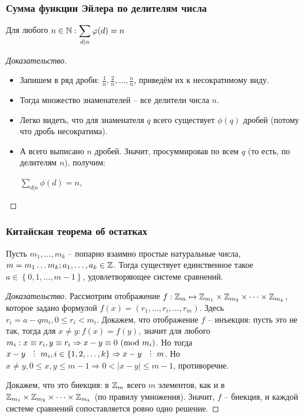 \begin{frame}[t]
    \frametitle{\bf \normalsize Сумма функции Эйлера по делителям числа}
    
    \setcounter{theorem}{16}
    \begin{theorem}[]
        Для любого $n \in \mathbb{N}: \displaystyle \sum_{d \mid n} \varphi(d) = n$
    \end{theorem}

    \begin{proof}[Доказательство]
        \begin{itemize}
            \item Запишем в ряд дроби: $\frac{1}{n}, \frac{2}{n}, \dots, \frac{n}{n}$, приведём их к несократимому виду.
            \item Тогда множество знаменателей -- все делители числа $n$.
            \item Легко видеть, что для знаменателя $q$ всего существует $\phi(q)$ дробей (потому что дробь несократима).
            \item А всего выписано $n$ дробей. Значит, просуммировав по всем $q$ (то есть, по делителям $n$), получим:
                \begin{center}
                    $\displaystyle\sum_{d | n} \phi(d) = n$, \qedsymbol
                \end{center}
        \end{itemize}
    \end{proof}
\end{frame}



\begin{frame}[t]
    \frametitle{\bf \normalsize Китайская теорема об остатках}
    \small
    \setcounter{theorem}{18}
    \begin{theorem}
        Пусть $m_1, \dots, m_k$ -- попарно взаимно простые натуральные числа, $m = m_1 \dots m_k; a_1, \dots, a_k \in \mathbb{Z}$. Тогда существует единственное такое $a \in \left\{ 0, 1, \dots , m-1 \right \} $, удовлетворяющее системе сравнений.
    \end{theorem}

    \begin{proof}[Доказательство]
        Рассмотрим отображение $f: \mathbb{Z}_m \mapsto \mathbb{Z}_{m_1} \times \mathbb{Z}_{m_2} \times \dots \times \mathbb{Z}_{m_k}$, которое задано формулой $f(x) = \left( r_1, \dots, r_i, \dots, r_m \right)$. Здесь $r_i = a - qm_i, 0 \leq r_i < m_i$. Докажем, что отображение $f$ -- инъекция: пусть это не так, тогда для $x \neq y: f(x) = f(y)$, значит для любого $m_i: x \equiv r_i, y \equiv r_i \Rightarrow x-y \equiv 0 \ (\mathrm{mod}\ m_i) $. Но тогда $x-y \Div m_i, i \in \left\{ 1, 2, \dots , k \right \} \Rightarrow x-y \Div m$. Но $x \neq y, 0 \leq x,y \leq m-1 \Rightarrow 0 < \left| x - y \right| \leq m-1$, противоречие. 

        Докажем, что это биекция: в $\mathbb{Z}_m$ всего $m$ элементов, как и в $\mathbb{Z}_{m_1} \times \mathbb{Z}_{m_2} \times \dots \times \mathbb{Z}_{m_k}$ (по правилу умножения). Значит, $f$ -- биекция, и каждой системе сравнений сопоставляется ровно одно решение.
    \end{proof}
\end{frame}

